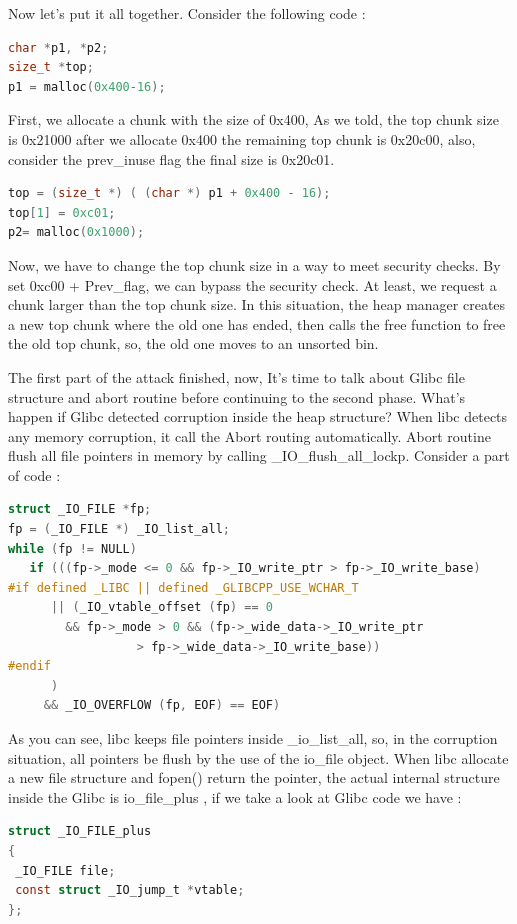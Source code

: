 \documentclass{masterthesis}
\begin{document}
Now let's put it all together. Consider the following code :
\begin{lstlisting}[language=c,frame=tlrb]
char *p1, *p2;
size_t *top;
p1 = malloc(0x400-16);
 \end{lstlisting}
First, we allocate a chunk with the size of 0x400, As we told, the top chunk size is 0x21000 after we allocate 0x400 the remaining top chunk is 0x20c00, also, consider the prev\_inuse flag the final size is 0x20c01.
\begin{lstlisting}[language=c,frame=tlrb]
top = (size_t *) ( (char *) p1 + 0x400 - 16);
top[1] = 0xc01;
p2= malloc(0x1000); 
\end{lstlisting}
Now, we have to change the top chunk size in a way to meet security checks. By set 0xc00 + Prev\_flag, we can bypass the security check. At least, we request a chunk larger than the top chunk size. In this situation, the heap manager creates a new top chunk where the old one has ended, then calls the free function to free the old top chunk, so, the old one moves to an unsorted bin. 

The first part of the attack finished, now, It's time to talk about Glibc file structure and abort routine before continuing to the second phase. What's happen if Glibc detected corruption inside the heap structure? When libc detects any memory corruption, it call the Abort routing automatically. Abort routine flush all file pointers in memory by calling \_IO\_flush\_all\_lockp. Consider a part of code : 
\begin{lstlisting}[language=c,frame=tlrb]
struct _IO_FILE *fp;
fp = (_IO_FILE *) _IO_list_all;
while (fp != NULL)
   if (((fp->_mode <= 0 && fp->_IO_write_ptr > fp->_IO_write_base)
#if defined _LIBC || defined _GLIBCPP_USE_WCHAR_T
	  || (_IO_vtable_offset (fp) == 0
	    && fp->_mode > 0 && (fp->_wide_data->_IO_write_ptr
				  > fp->_wide_data->_IO_write_base))
#endif
	  )
	 && _IO_OVERFLOW (fp, EOF) == EOF)
\end{lstlisting}
As you can see, libc keeps file pointers inside \_io\_list\_all, so, in the corruption situation, all pointers be flush by the use of the io\_file object. When libc allocate a new file structure and fopen() return the pointer, the actual internal structure inside the Glibc is io\_file\_plus , if we take a look at Glibc code we have :
\begin{lstlisting}[language=c,frame=tlrb]
struct _IO_FILE_plus
{
 _IO_FILE file;
 const struct _IO_jump_t *vtable;
};
\end{lstlisting}
\end{document}
